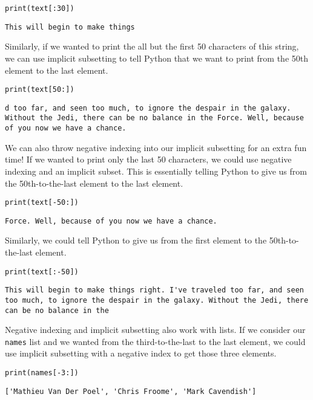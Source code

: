 \begin{lstlisting}[style=pippython]
print(text[:30])
\end{lstlisting}
\begin{lstlisting}[style=none]
This will begin to make things
\end{lstlisting}
Similarly, if we wanted to print the all but the first 50 characters of this string, we can use implicit subsetting to tell Python that we want to print from the 50th element to the last element.
\begin{lstlisting}[style=pippython]
print(text[50:])
\end{lstlisting}
\begin{lstlisting}[style=none]
d too far, and seen too much, to ignore the despair in the galaxy. Without the Jedi, there can be no balance in the Force. Well, because of you now we have a chance.
\end{lstlisting}
We can also throw negative indexing into our implicit subsetting for an extra fun time! If we wanted to print only the last 50 characters, we could use negative indexing and an implicit subset. This is essentially telling Python to give us from the 50th-to-the-last element to the last element.
\begin{lstlisting}[style=pippython]
print(text[-50:])
\end{lstlisting}
\begin{lstlisting}[style=none]
 Force. Well, because of you now we have a chance.
\end{lstlisting}
Similarly, we could tell Python to give us from the first element to the 50th-to-the-last element.
\begin{lstlisting}[style=pippython]
print(text[:-50])
\end{lstlisting}
\begin{lstlisting}[style=none]
This will begin to make things right. I've traveled too far, and seen too much, to ignore the despair in the galaxy. Without the Jedi, there can be no balance in the
\end{lstlisting}
Negative indexing and implicit subsetting also work with lists. If we consider our \verb|names| list and we wanted from the third-to-the-last to the last element, we could use implicit subsetting with a negative index to get those three elements.
\begin{lstlisting}[style=pippython]
print(names[-3:])
\end{lstlisting}
\begin{lstlisting}[style=none]
['Mathieu Van Der Poel', 'Chris Froome', 'Mark Cavendish']
\end{lstlisting}
